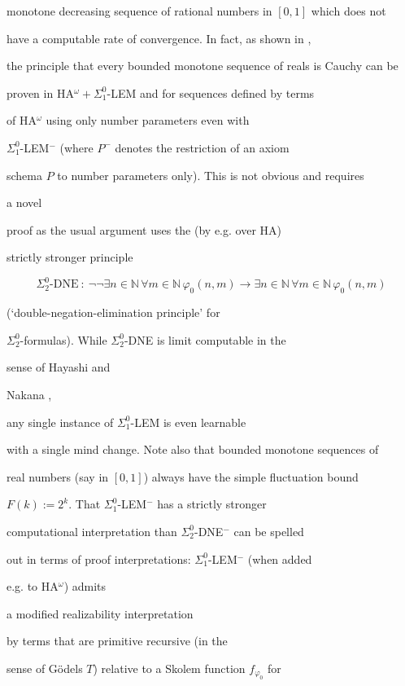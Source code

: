 \documentclass[1p]{elsarticle}
\newcommand{\NN}{\ensuremath{\mathbb{N}}}
\theoremstyle{plain}
\theoremstyle{definition}
\theoremstyle{remark}
\theoremstyle{definition}
\begin{document}
monotone decreasing sequence of rational numbers in $[0,1]$ which does not 

have a computable rate of convergence. In fact, as shown in \cite{Toftdal}, 

the principle that every bounded monotone sequence of reals is Cauchy can be 

proven in HA$^{\omega}+\Sigma^0_1$-LEM and for sequences defined by terms 

of HA$^{\omega}$ using only number parameters even with 

$\Sigma^0_1$-LEM$^-$ (where $P^-$ denotes the restriction of an axiom 

schema $P$ to number parameters only). This is not obvious and requires 

a novel 

proof as the usual argument uses the (by \cite{Akama} e.g. over HA) 

strictly stronger principle 

\[ \Sigma^0_2\mbox{-DNE}\ :\ \neg\neg\exists n\in\NN\,\forall m\in\NN\,

\varphi_0(n,m)\to\exists n\in\NN\,\forall m\in\NN\,\varphi_0(n,m) \]

(`double-negation-elimination principle' for 

$\Sigma^0_2$-formulas). While $\Sigma^0_2$-DNE is limit computable in the 

sense of Hayashi and 

Nakana \cite{Hayashi/Nakata}, 

any single instance of $\Sigma^0_1$-LEM is even learnable 

with a single mind change. Note also that bounded monotone sequences of 

real numbers (say in $[0,1]$) always have the simple fluctuation bound 

$F(k):=2^k.$ That $\Sigma^0_1$-LEM$^-$ has a strictly stronger 

computational interpretation than $\Sigma^0_2$-DNE$^-$ can be spelled 

out in terms of proof interpretations:  $\Sigma^0_1$-LEM$^-$ (when added 

e.g. to HA$^{\omega}$) admits  

a modified realizability interpretation 

by terms that are primitive recursive (in the 

sense of G\"odels $T$) relative to a Skolem function $f_{\varphi_0}$ for 
\end{document}
